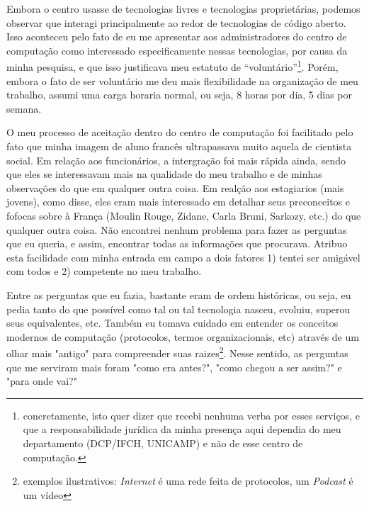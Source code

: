 Embora o centro usasse de tecnologias livres e tecnologias proprietárias, podemos observar que interagi principalmente ao redor de tecnologias de código aberto. Isso aconteceu pelo fato de eu me apresentar aos administradores do centro de computação como interessado especificamente nessas tecnologias, por causa da minha pesquisa, e que isso justificava meu estatuto de “voluntário”\footnote{concretamente, isto quer dizer que recebi nenhuma verba por esses serviços, e que a responsabilidade jurídica da minha presença aqui dependia do meu departamento (DCP/IFCH, UNICAMP) e não de esse centro de computação.}. Porém, embora o fato de ser volunt\'ario me deu mais flexibilidade na organizaç\~ao de meu trabalho, assumi uma carga horaria normal, ou seja, 8 horas por dia, 5 dias por semana.

O meu processo de aceitaç\~ao dentro do centro de computaç\~ao foi facilitado pelo fato que minha imagem de aluno francês ultrapassava muito aquela de cientista social. Em relaç\~ao aos funcion\'arios, a intergraç\~ao foi mais r\'apida ainda, sendo que eles se interessavam mais na qualidade do meu trabalho e de minhas observaç\~oes do que em qualquer outra coisa. Em realç\~ao aos estagiarios (mais jovens), como disse, eles eram mais interessado em detalhar seus preconceitos e fofocas sobre à França (Moulin Rouge, Zidane, Carla Bruni, Sarkozy, etc.) do que qualquer outra coisa. N\~ao encontrei nenhum problema para fazer as perguntas que eu queria, e assim, encontrar todas as informaç\~oes que procurava. Atribuo esta facilidade com minha entrada em campo a dois fatores 1) tentei ser amig\'avel com todos e 2) competente no meu trabalho. 

Entre as perguntas que eu fazia, bastante eram de ordem hist\'oricas, ou seja, eu pedia tanto do que poss\'ivel como tal ou tal tecnologia nasceu, evoluiu, superou seus equivalentes, etc. Também eu tomava cuidado em entender os conceitos modernos de computaç\~ao (protocolos, termos organizacionais, etc) através de um olhar mais "antigo" para compreender suas raizes\footnote{exemplos ilustrativos: \emph{Internet} é uma rede feita de protocolos, um \emph{Podcast} é um v\'ideo}. Nesse sentido, as perguntas que me serviram mais foram "como era antes?", "como chegou a ser assim?" e "para onde vai?"

